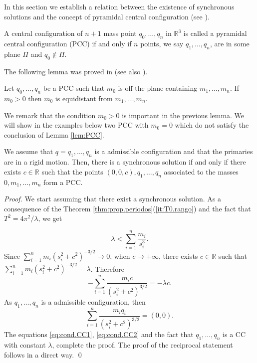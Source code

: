 \documentclass[smallcondensed]{svjour3}
\newcommand{\rr}{\mathbb{R}}
\begin{document}
In this section we establish a relation between the existence of synchronous solutions and the concept of pyramidal central configuration (see \cite{fayccal1996classification,faycaltesis,ouyang2004pyramidal}).

\begin{definition}
A central configuration of $n+1$ mass point $q_0,\ldots,q_{n}$ in $\rr^{3}$  is called a pyramidal central configuration (PCC) if and only if $n$ points, we say $q_1,\ldots,q_n$, are in some plane $\Pi$ and $q_{0}\notin \Pi$.
\end{definition}

The following lemma was proved in \cite{ouyang2004pyramidal} (see also \cite{faycaltesis}).
\begin{lemma}\label{lem:PCC}
 Let $q_0,\ldots,q_{n}$ be a PCC such that $m_{0}$ is off the plane containing $m_1,\ldots,m_n$. If $m_{0}>0$ then $m_{0}$ is equidistant from $m_1,\ldots,m_n$.
\end{lemma}

We remark that the condition $m_{0}>0$ is important in the previous lemma. We will show in the examples below two PCC with $m_{0}=0$ which do not satisfy the conclusion of  Lemma \ref{lem:PCC}.



\begin{proposition}\label{cor:sol.sincronica}
We assume that $q=q_1,\ldots,q_n$ is a admissible   configuration and that the primaries are in a rigid motion. Then, there is a synchronous solution if and only if there exists $c\in \rr$ such that the points $(0,0,c),q_1,\ldots,q_{n}$ associated to the masses $0,m_1,\ldots,m_{n}$ form a PCC.
\end{proposition}

\begin{proof}
We start assuming that there exist a synchronous solution. As a consequence of the Theorem \ref{thm:prop.periodos}(\ref{it:T0.rango}) and the fact that $T^2=4\pi^2/\lambda$, we get

 \begin{equation}\label{eq:lamdbda<suma.si3}
\lambda<\sum_{i=1}^n\frac{m_i}{s_i^3}.
 \end{equation}
 Since $\sum_{i=1}^{n}m_i\left(s_i^2+c^2\right)^{-3/2}\to 0$, when $c\to +\infty$, there exists $c\in \rr$ such that
 $ \sum_{i=1}^{n}m_i\left(s_i^2+c^2\right)^{-3/2}=\lambda$. Therefore
 \begin{equation}\label{eq:cond.CC1}
  -\sum_{i=1}^{n}\frac{m_i c}{\left(s_i^2+c^2\right)^{3/2}}=-\lambda c.
 \end{equation}
As $q_1,\ldots,q_n$ is a admissible configuration, then
\begin{equation}\label{eq:cond.CC2}
   \sum_{i=1}^{n}\frac{m_i q_i}{\left(s_i^2+c^2\right)^{3/2}}= (0,0).
\end{equation}
The equations \eqref{eq:cond.CC1}, \eqref{eq:cond.CC2}  and the fact that $q_1,\ldots,q_n$ is a CC with constant $\lambda$, complete the proof.
The proof of the reciprocal statement follows in a direct way.
\qed\end{proof}
\end{document}
